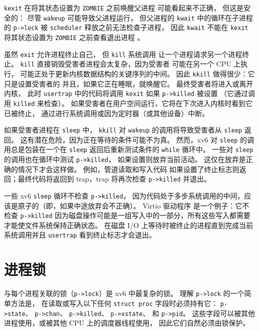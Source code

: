 \lstinline{kexit} 在将其状态设置为 \lstinline{ZOMBIE} 之前唤醒父进程
可能看起来不正确，
但这是安全的：
尽管
\lstinline{wakeup}
可能导致父进程运行，
但父进程的
\lstinline{kwait}
中的循环在子进程的
\lstinline{p->lock}
被 {\tt scheduler} 释放之前无法检查子进程，
因此
\lstinline{kwait}
不能在
\lstinline{kexit}
将其状态设置为
\lstinline{ZOMBIE}
之前查看退出进程
。

虽然
\lstinline{exit}
允许进程终止自己，
但 \lstinline{kill} 系统调用
让一个进程请求另一个进程终止。
\lstinline{kill}
直接销毁受害者进程会太复杂，因为受害者
可能在另一个 CPU 上执行，
可能正处于更新内核数据结构的关键序列的中间。
因此
\lstinline{kkill}
做得很少：它只是设置受害者的
并且，如果它正在睡眠，就唤醒它。
最终受害者将进入或离开内核，
此时
\lstinline{usertrap}
中的代码将调用
\lstinline{kexit}
如果
\lstinline{p->killed}
被设置
（它通过调用
\lstinline{killed}
来检查）。
如果受害者在用户空间运行，它将在下次进入内核时看到它已被终止，
通过进行系统调用或因为定时器（或其他设备）中断。

如果受害者进程在
\lstinline{sleep}
中，
\lstinline{kkill} 对
\lstinline{wakeup}
的调用将导致受害者从
\lstinline{sleep}
返回。
这有潜在危险，因为正在等待的条件可能不为真。
然而，xv6 对
\lstinline{sleep}
的调用总是包装在一个在
\lstinline{sleep}
返回后重新测试条件的
\lstinline{while}
循环中。
一些对
\lstinline{sleep}
的调用也在循环中测试
\lstinline{p->killed}，
如果设置则放弃当前活动。
这仅在放弃是正确的情况下才会这样做。
例如，管道读取和写入代码
如果设置了终止标志则返回；最终代码将返回到 trap，trap 将再次检查 \lstinline{p->killed} 并退出。

一些 xv6
\lstinline{sleep}
循环不检查
\lstinline{p->killed}，
因为代码处于多步系统调用的中间，应该是原子的（即，如果中途放弃会不正确）。
Virtio 驱动程序
是一个例子：它不检查
\lstinline{p->killed}
因为磁盘操作可能是一组写入中的一部分，所有这些写入都需要才能使文件系统保持正确状态。
在磁盘 I/O 上等待时被终止的进程直到完成当前系统调用并且
\lstinline{usertrap} 看到终止标志才会退出。

\section{进程锁}

与每个进程关联的锁（\lstinline{p->lock}）是 xv6 中最复杂的锁。
理解 \lstinline{p->lock} 的一个简单方法是，
在读取或写入以下任何 \lstinline{struct proc} 字段时必须持有它：
\lstinline{p->state}、
\lstinline{p->chan}、
\lstinline{p->killed}、
\lstinline{p->xstate}、
和
\lstinline{p->pid}。
这些字段可以被其他进程使用，或被其他 CPU 上的调度器线程使用，
因此它们自然必须由锁保护。

